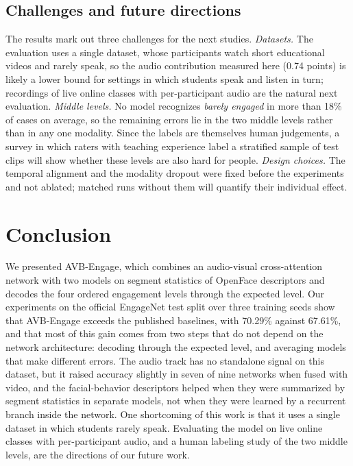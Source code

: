 \documentclass[pdflatex,iicol,sn-basic]{sn-jnl}
\newcommand{\ournet}{AVB-Engage}
\begin{document}
\subsection{Challenges and future directions}\label{sec:limitations}

The results mark out three challenges for the next studies. \emph{Datasets.} The evaluation uses a single dataset, whose participants watch short educational videos and rarely speak, so the audio contribution measured here (0.74 points) is likely a lower bound for settings in which students speak and listen in turn; recordings of live online classes with per-participant audio are the natural next evaluation. \emph{Middle levels.} No model recognizes \emph{barely engaged} in more than 18\% of cases on average, so the remaining errors lie in the two middle levels rather than in any one modality. Since the labels are themselves human judgements, a survey in which raters with teaching experience label a stratified sample of test clips will show whether these levels are also hard for people. \emph{Design choices.} The temporal alignment and the modality dropout were fixed before the experiments and not ablated; matched runs without them will quantify their individual effect.

\section{Conclusion}\label{sec:conclusion}

We presented \ournet, which combines an audio-visual cross-attention network with two models on segment statistics of OpenFace descriptors and decodes the four ordered engagement levels through the expected level. Our experiments on the official EngageNet test split over three training seeds show that \ournet{} exceeds the published baselines, with 70.29\% against 67.61\%, and that most of this gain comes from two steps that do not depend on the network architecture: decoding through the expected level, and averaging models that make different errors. The audio track has no standalone signal on this dataset, but it raised accuracy slightly in seven of nine networks when fused with video, and the facial-behavior descriptors helped when they were summarized by segment statistics in separate models, not when they were learned by a recurrent branch inside the network. One shortcoming of this work is that it uses a single dataset in which students rarely speak. Evaluating the model on live online classes with per-participant audio, and a human labeling study of the two middle levels, are the directions of our future work.
\end{document}
